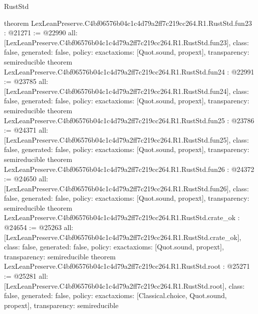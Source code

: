 \begin{lexlean}{RustStd}
\begin{coremodule}
{}
theorem LexLeanPreserve.C4bf06576b04c1c4d79a2ff7c219cc264.R1.RustStd.fun23 : @21271 := @22990 {
  all: [LexLeanPreserve.C4bf06576b04c1c4d79a2ff7c219cc264.R1.RustStd.fun23],
  class: false,
  generated: false,
  policy: exact{axioms: [Quot.sound, propext]},
  transparency: semireducible
}
theorem LexLeanPreserve.C4bf06576b04c1c4d79a2ff7c219cc264.R1.RustStd.fun24 : @22991 := @23785 {
  all: [LexLeanPreserve.C4bf06576b04c1c4d79a2ff7c219cc264.R1.RustStd.fun24],
  class: false,
  generated: false,
  policy: exact{axioms: [Quot.sound, propext]},
  transparency: semireducible
}
theorem LexLeanPreserve.C4bf06576b04c1c4d79a2ff7c219cc264.R1.RustStd.fun25 : @23786 := @24371 {
  all: [LexLeanPreserve.C4bf06576b04c1c4d79a2ff7c219cc264.R1.RustStd.fun25],
  class: false,
  generated: false,
  policy: exact{axioms: [Quot.sound, propext]},
  transparency: semireducible
}
theorem LexLeanPreserve.C4bf06576b04c1c4d79a2ff7c219cc264.R1.RustStd.fun26 : @24372 := @24650 {
  all: [LexLeanPreserve.C4bf06576b04c1c4d79a2ff7c219cc264.R1.RustStd.fun26],
  class: false,
  generated: false,
  policy: exact{axioms: [Quot.sound, propext]},
  transparency: semireducible
}
theorem LexLeanPreserve.C4bf06576b04c1c4d79a2ff7c219cc264.R1.RustStd.crate_ok : @24654 := @25263 {
  all: [LexLeanPreserve.C4bf06576b04c1c4d79a2ff7c219cc264.R1.RustStd.crate_ok],
  class: false,
  generated: false,
  policy: exact{axioms: [Quot.sound, propext]},
  transparency: semireducible
}
theorem LexLeanPreserve.C4bf06576b04c1c4d79a2ff7c219cc264.R1.RustStd.root : @25271 := @25281 {
  all: [LexLeanPreserve.C4bf06576b04c1c4d79a2ff7c219cc264.R1.RustStd.root],
  class: false,
  generated: false,
  policy: exact{axioms: [Classical.choice, Quot.sound, propext]},
  transparency: semireducible
}


\end{coremodule}
\end{lexlean}
